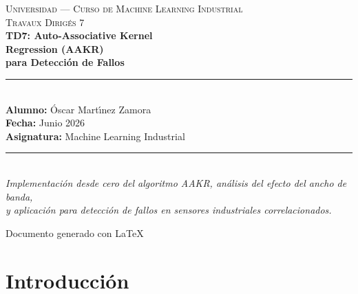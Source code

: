 \documentclass[12pt,a4paper]{article}
\begin{document}

\begin{titlepage}
  \pagecolor{azulTDS}
  \color{white}
  \centering
  \vspace*{2cm}

  {\fontsize{11}{13}\selectfont\textsc{Universidad --- Curso de Machine Learning Industrial}}\\[0.4cm]
  {\fontsize{11}{13}\selectfont\textsc{Travaux Dirig\'es 7}}\\[2.5cm]

  {\fontsize{26}{30}\bfseries\selectfont
    TD7: Auto-Associative Kernel\\[0.3cm]
    Regression (AAKR)\\[0.3cm]
    para Detecci\'on de Fallos
  }\\[2cm]

  \noindent\rule{0.6\linewidth}{1pt}\\[1.5cm]

  {\large\textbf{Alumno:} \'Oscar Mart\'{\i}nez Zamora}\\[0.4cm]
  {\large\textbf{Fecha:} Junio 2026}\\[0.4cm]
  {\large\textbf{Asignatura:} Machine Learning Industrial}\\[3cm]

  \noindent\rule{0.6\linewidth}{1pt}\\[1cm]

  {\normalsize\itshape
    Implementaci\'on desde cero del algoritmo AAKR, an\'alisis del efecto del ancho de banda,\\
    y aplicaci\'on para detecci\'on de fallos en sensores industriales correlacionados.
  }

  \vfill
  {\small Documento generado con \LaTeX{}}
\end{titlepage}
\pagecolor{white}\color{black}

\tableofcontents
\newpage

\section{Introducci\'on}
\end{document}
